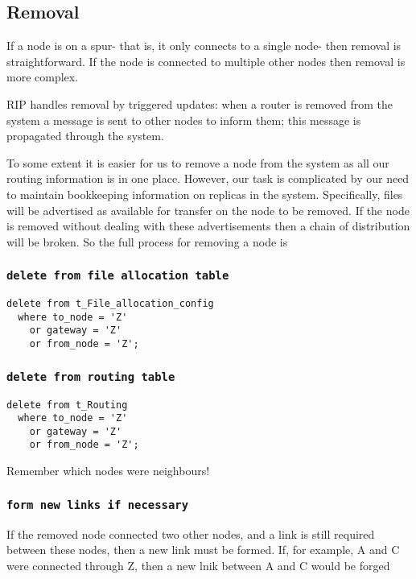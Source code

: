 \documentclass{cmspaper}
\begin{document}
\subsection{Removal}
If a node is on a spur- that is, it only connects to a single node- then removal is straightforward. If the node is connected to multiple other nodes then removal is more complex.

RIP handles removal by triggered updates: when a router is removed from the system a message is sent to other nodes to inform them; this message is propagated through the system. 

To some extent it is easier for us to remove a node from the system as all our routing information is in one place. However, our task is complicated by our need to maintain bookkeeping information on replicas in the system. Specifically, files will be advertised as available for transfer on the node to be removed. If the node is removed without dealing with these advertisements then a chain of distribution will be broken. So the full process for removing a node is

\subsubsection{\textbf{\texttt{delete from file allocation table}}}
{\small\begin{verbatim}
delete from t_File_allocation_config
  where to_node = 'Z'
    or gateway = 'Z'
    or from_node = 'Z';
\end{verbatim}}

\subsubsection{\textbf{\texttt{delete from routing table}}}

{\small\begin{verbatim}
delete from t_Routing
  where to_node = 'Z'
    or gateway = 'Z'
    or from_node = 'Z';
\end{verbatim}}

Remember which nodes were neighbours!

\subsubsection{\textbf{\texttt{form new links if necessary}}}
If the removed node connected two other nodes, and a link is still required between these nodes, then a new link must be formed. If, for example, A and C were connected through Z, then a new lnik between A and C would be forged
\end{document}

